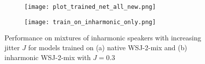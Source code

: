 \documentclass{article}
\begin{document}
\vspace*{-3mm}
\begin{figure}[t]
  \centering
  \begin{subfigure}[l]{0.23\textwidth}
  \texttt{[image: plot\_trained\_net\_all\_new.png]}
  \caption{}
  \label{fig:plot_trained_net}
  \end{subfigure}
\begin{subfigure}[l]{0.23\textwidth}
  \texttt{[image: train\_on\_inharmonic\_only.png]}
  \caption{}
  \label{fig:plot_train_on_inharmonic_only}
  \end{subfigure}
  \caption{Performance on mixtures of inharmonic speakers with increasing jitter $J$ for models trained on (a) native WSJ-2-mix and (b) inharmonic WSJ-2-mix with $J=0.3$}
 \vspace*{-6mm}
\end{figure}
\end{document}
